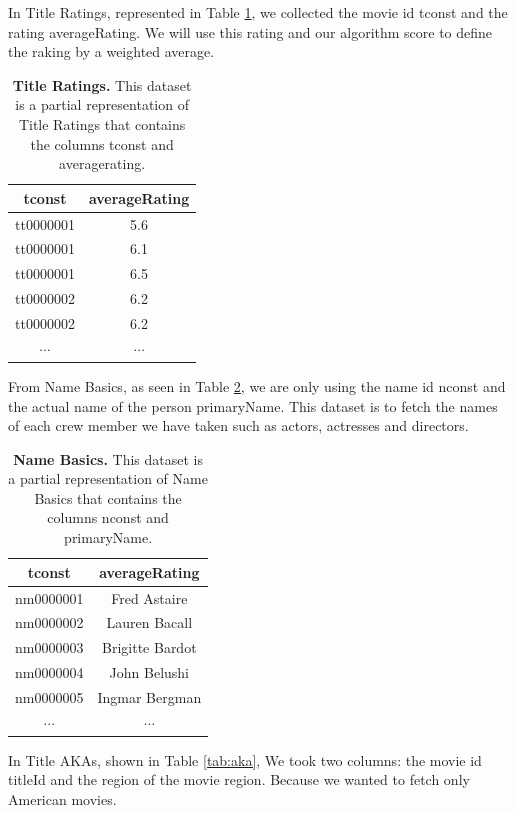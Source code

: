 In Title Ratings, represented in Table \ref{tab:ratings}, we collected the movie id tconst and the rating averageRating. We will use this rating and our algorithm score to define the raking by a weighted average.

\begin{table}[ht]
	\centering
	\caption{\textbf{Title Ratings.} This dataset is a partial representation of Title Ratings that contains the columns tconst and averagerating.}	
	\footnotesize
	\begin{tabular}{cc}
		\toprule
		tconst    & averageRating \\
		\midrule
		tt0000001 & 5.6           \\
		tt0000001 & 6.1           \\
		tt0000001 & 6.5           \\
		tt0000002 & 6.2           \\		
		tt0000002 & 6.2           \\
		$\cdots$  & $\cdots$      \\
		\bottomrule
	\end{tabular}	
 	\label{tab:ratings}
\end{table}

From Name Basics, as seen in Table \ref{tab:name}, we are only using the name id nconst and the actual name of the person primaryName. This dataset is to fetch the names of each crew member we have taken such as actors, actresses and directors.

\begin{table}[ht]
	\centering
	\caption{\textbf{Name Basics.} This dataset is a partial representation of Name Basics that contains the columns nconst and primaryName.}
	\footnotesize
	\begin{tabular}{cc}
		\toprule
		tconst    & averageRating   \\
		\midrule
		nm0000001 & Fred Astaire    \\
		nm0000002 & Lauren Bacall   \\
		nm0000003 & Brigitte Bardot \\
		nm0000004 & John Belushi    \\		
		nm0000005 & Ingmar Bergman  \\
		$\cdots$  &     $\cdots$    \\
		\bottomrule
	\end{tabular}	
 	\label{tab:name}
\end{table}

In Title AKAs, shown in Table \ref{tab:aka}, We took two columns: the movie id titleId and the region of the movie region. Because we wanted to fetch only American movies.

